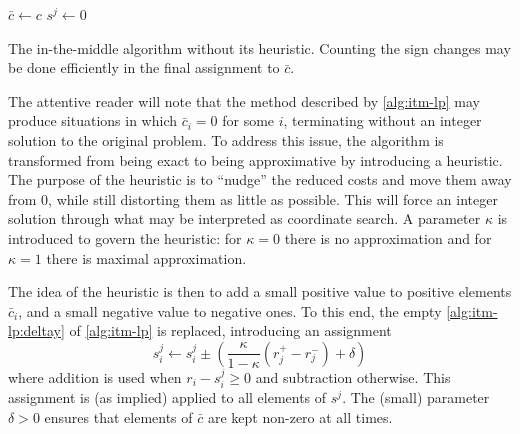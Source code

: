 \begin{algorithm}[tp]
	\(\bar{c} \leftarrow c\) \;
	\(s^j \leftarrow 0\) \;

	\caption{
		The in-the-middle algorithm without its heuristic.
		Counting the sign changes may be done efficiently in the final assignment to \(\bar{c}\).
	}
	\label{alg:itm-lp}
\end{algorithm}

The attentive reader will note that the method described by \cref{alg:itm-lp} may produce situations in which \(\bar{c}_i = 0\) for some \(i\), terminating without an integer solution to the original problem.
To address this issue, the algorithm is transformed from being exact to being approximative by introducing a heuristic.
The purpose of the heuristic is to \enquote{nudge} the reduced costs and move them away from \(0\), while still distorting them as little as possible.
This will force an integer solution through what may be interpreted as coordinate search.
A parameter \(\kappa\) is introduced to govern the heuristic: for \(\kappa=0\) there is no approximation and for \(\kappa=1\) there is maximal approximation.

The idea of the heuristic is then to add a small positive value to positive elements \(\bar{c}_i\), and a small negative value to negative ones.
To this end, the empty \cref{alg:itm-lp:deltay} of \cref{alg:itm-lp} is replaced, introducing an assignment
\begin{equation*}
	s^j_i \leftarrow s^j_i \pm \left(\frac{\kappa}{1-\kappa}(r^+_j - r^-_j) + \delta\right)
\end{equation*}
where addition is used when \(r_i - s^j_i \geq 0\) and subtraction otherwise.
This assignment is (as implied) applied to all elements of \(s^j\).
The (small) parameter \(\delta>0\) ensures that elements of \(\bar{c}\) are kept non-zero at all times.

